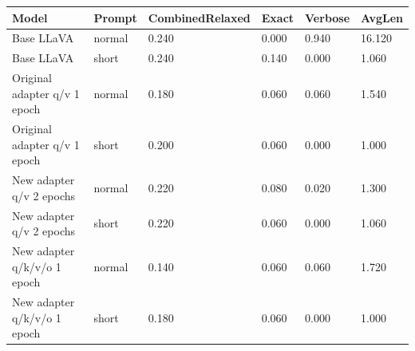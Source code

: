 \begin{tabular}{llllll}
\toprule
Model & Prompt & CombinedRelaxed & Exact & Verbose & AvgLen \\
\midrule
Base LLaVA & normal & 0.240 & 0.000 & 0.940 & 16.120 \\
Base LLaVA & short & 0.240 & 0.140 & 0.000 & 1.060 \\
Original adapter q/v 1 epoch & normal & 0.180 & 0.060 & 0.060 & 1.540 \\
Original adapter q/v 1 epoch & short & 0.200 & 0.060 & 0.000 & 1.000 \\
New adapter q/v 2 epochs & normal & 0.220 & 0.080 & 0.020 & 1.300 \\
New adapter q/v 2 epochs & short & 0.220 & 0.060 & 0.000 & 1.060 \\
New adapter q/k/v/o 1 epoch & normal & 0.140 & 0.060 & 0.060 & 1.720 \\
New adapter q/k/v/o 1 epoch & short & 0.180 & 0.060 & 0.000 & 1.000 \\
\bottomrule
\end{tabular}
